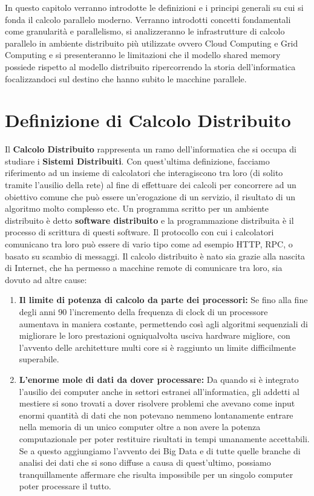 In questo capitolo verranno introdotte le definizioni e i principi generali su cui si fonda il calcolo parallelo moderno. Verranno introdotti concetti fondamentali come granularità e parallelismo, si analizzeranno le infrastrutture di calcolo parallelo in ambiente distribuito più utilizzate ovvero Cloud Computing e Grid Computing e si presenteranno le limitazioni che il modello shared memory possiede rispetto al modello distribuito ripercorrendo la storia dell'informatica focalizzandoci sul destino che hanno subito le macchine parallele.
\section{Definizione di Calcolo Distribuito}
Il \textbf{Calcolo Distribuito} rappresenta un ramo dell'informatica che si occupa di studiare i \textbf{Sistemi Distribuiti}. Con quest'ultima definizione, facciamo riferimento ad un insieme di calcolatori che interagiscono tra loro (di solito tramite l'ausilio della rete) al fine di effettuare dei calcoli per concorrere ad un obiettivo comune che può essere un'erogazione di un servizio, il risultato di un algoritmo molto complesso etc. Un programma scritto per un ambiente distribuito è detto \textbf{software distribuito} e la programmazione distribuita è il processo di scrittura di questi software. Il protocollo con cui i calcolatori comunicano tra loro può essere di vario tipo come ad esempio HTTP, RPC, o basato su scambio di messaggi. Il calcolo distribuito è nato sia grazie alla nascita di Internet, che ha permesso a macchine remote di comunicare tra loro, sia dovuto ad altre cause:
\begin{enumerate}
  \item \textbf{Il limite di potenza di calcolo da parte dei processori:} Se fino alla fine degli anni 90 l'incremento della frequenza di clock di un processore aumentava in maniera costante, permettendo così agli algoritmi sequenziali di migliorare le loro prestazioni ogniqualvolta usciva hardware migliore, con l'avvento delle architetture multi core si è raggiunto un limite difficilmente superabile.
  \item \textbf{L'enorme mole di dati da dover processare:} Da quando si è integrato l'ausilio dei computer anche in settori estranei all'informatica, gli addetti al mestiere si sono trovati a dover risolvere problemi che avevano come input enormi quantità di dati che non potevano nemmeno lontanamente entrare nella memoria di un unico computer oltre a non avere la potenza computazionale per poter restituire risultati in tempi umanamente accettabili. Se a questo aggiungiamo l'avvento dei Big Data e di tutte quelle branche di analisi dei dati che si sono diffuse a causa di quest'ultimo, possiamo tranquillamente affermare che risulta impossibile per un singolo computer poter processare il tutto. 
\end{enumerate}
